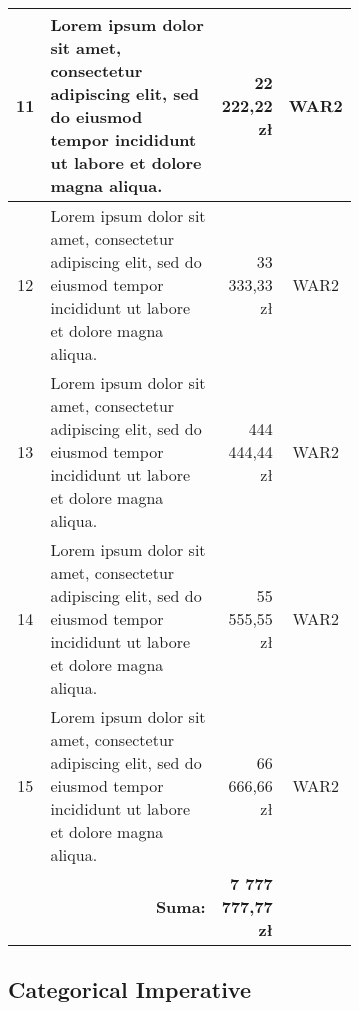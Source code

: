 \begin{longtable}{| c | m{0.58\linewidth} | r | m{0.1\linewidth} |}
	11 & Lorem ipsum dolor sit amet, consectetur adipiscing elit, sed do eiusmod tempor incididunt ut labore et dolore magna aliqua. & 22 222,22 zł & \multicolumn{1}{c|}{WAR2} \\ \hline
	12 & Lorem ipsum dolor sit amet, consectetur adipiscing elit, sed do eiusmod tempor incididunt ut labore et dolore magna aliqua. & 33 333,33 zł & \multicolumn{1}{c|}{WAR2} \\ \hline
	13 & Lorem ipsum dolor sit amet, consectetur adipiscing elit, sed do eiusmod tempor incididunt ut labore et dolore magna aliqua. & 444 444,44 zł & \multicolumn{1}{c|}{WAR2} \\ \hline
	14 & Lorem ipsum dolor sit amet, consectetur adipiscing elit, sed do eiusmod tempor incididunt ut labore et dolore magna aliqua. & 55 555,55 zł & \multicolumn{1}{c|}{WAR2} \\ \hline
	15 & Lorem ipsum dolor sit amet, consectetur adipiscing elit, sed do eiusmod tempor incididunt ut labore et dolore magna aliqua. & 66 666,66 zł & \multicolumn{1}{c|}{WAR2} \\ \hline
	& \multicolumn{1}{r|}{\textbf{Suma:}} & \textbf{7 777 777,77 zł} & 
	\label{table:koszty}
\end{longtable}
\kant[4]

\subsection{Categorical Imperative}
\kant[6]

